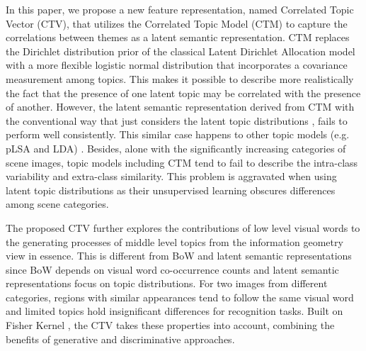 \documentclass[journal]{IEEEtran}
\begin{document}
In this paper, we propose a new feature representation, named Correlated Topic Vector (CTV), that utilizes the Correlated Topic Model (CTM) \cite{blei2006correlated, blei2007correction} to capture the correlations between themes as a latent semantic representation. CTM replaces the Dirichlet distribution prior of the classical Latent Dirichlet Allocation model with a more flexible logistic normal distribution \cite{aitchison1986statistical} that incorporates a covariance measurement among topics. This makes it possible to describe more realistically the fact that the presence of one latent topic may be correlated with the presence of another. However, the latent semantic representation derived from CTM with the conventional way that just considers the latent topic distributions \cite{bosch2006scene, bosch2008scene}, fails to perform well consistently. This similar case happens to other topic models (e.g. pLSA and LDA) \cite{quelhas2007thousand}. Besides, alone with the significantly increasing categories of scene images, topic models including CTM tend to fail to describe the intra-class variability and extra-class similarity. This problem is aggravated when using latent topic distributions as their unsupervised learning obscures differences among scene categories.

The proposed CTV further explores the contributions of low level visual words to the generating processes of middle level topics from the information geometry view in essence. This is different from BoW and latent semantic representations since BoW depends on visual word co-occurrence counts and latent semantic representations focus on topic distributions.
For two images from different categories, regions with similar appearances tend to follow the same visual word and limited topics hold insignificant differences for recognition tasks. %
Built on Fisher Kernel \cite{zhou2014learning}, the CTV takes these properties into account, combining the benefits of generative and discriminative approaches.
\end{document}
